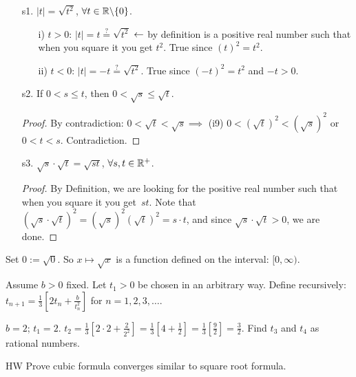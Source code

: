 \documentclass[]{article}
\begin{document}
\begin{enumerate}
	\item[s1.] $|t| = \sqrt{t^2}$, $\forall t\in\mathbb{R} \backslash \{0\}$.
	\begin{enumerate}
		\item[i)] $t>0$: $|t|=t \stackrel{?}{=} \sqrt{t^2}$ $\leftarrow$ by definition is a positive real number such that when you square it you get $t^2$. True since $(t)^2 = t^2$.
		\item[ii)] $t<0$: $|t| = -t \stackrel{?}{=} \sqrt{t^2}$. True since $(-t)^2=t^2$ and $-t>0$.
	\end{enumerate}
	\item[s2.] If $0<s\leq t$, then $0<\sqrt{s} \leq \sqrt{t}$.
	\begin{proof}
		By contradiction: $0<\sqrt{t} < \sqrt{s} \implies $ (i9) $ 0<(\sqrt{t})^2 < (\sqrt{s})^2$ or $0<t<s$. Contradiction.
	\end{proof}
	\item[s3.] $\sqrt{s}\cdot \sqrt{t} = \sqrt{st}$, $\forall s,t\in\mathbb{R}^+$.
	\begin{proof}
		By Definition, we are looking for the positive real number such that when you square it you get~$st$. Note that  $\left( \sqrt{s} \cdot \sqrt{t} \right)^2 = \left(\sqrt{s}\right)^2\left(\sqrt{t}\right)^2 = s \cdot t$, and since $\sqrt{s}\cdot \sqrt{t} >0$, we are done.
	\end{proof}
\end{enumerate}

Set $0:=\sqrt{0}$. So $x\mapsto \sqrt{x}$ is a function defined on the interval: $[0,\infty)$.

\begin{example}
	 Assume $b>0$ fixed. Let $t_1>0$ be chosen in an arbitrary way. Define recursively: $t_{n+1} = \frac{1}{3} \left[ 2t_n + \frac{b}{t_n^2} \right]$ for $n=1,2,3,\dots$.
\end{example}

\begin{example}
	[HW] $b=2$; $t_1 = 2$. $t_2 = \frac{1}{3} \left[ 2\cdot 2 + \frac{2}{2^2} \right] = \frac{1}{3} \left[ 4 + \frac{1}{2} \right] = \frac{1}{3} \left[ \frac{9}{2} \right] = \frac{3}{2}$. Find $t_3$ and $t_4$ as rational numbers.
\end{example}

HW Prove cubic formula converges similar to square root formula.
\end{document}
